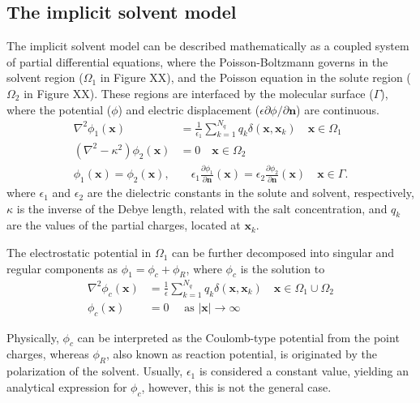 \subsection*{\sffamily \large The implicit solvent model}

The implicit solvent model can be described mathematically as a coupled system of partial differential equations, where the Poisson-Boltzmann governs in the solvent region ($\Omega_1$ in Figure XX), and the Poisson equation in the solute region ($\Omega_2$ in Figure XX). These regions are interfaced by the molecular surface ($\Gamma$), where the potential ($\phi$) and electric displacement ($\epsilon\partial\phi/\partial\mathbf{n}$) are continuous. 
%
\begin{align}\label{eq:pbe}
\nabla^2\phi_1(\mathbf{x}) &= \frac{1}{\epsilon_1}\sum_{k=1}^{N_q} q_k\delta(\mathbf{x},\mathbf{x}_k) \quad  \mathbf{x} \in \Omega_1\nonumber\\
\left(\nabla^2 - \kappa^2\right)\phi_2(\mathbf{x})  &= 0 \quad\mathbf{x}\in\Omega_2\nonumber\\
\phi_1(\mathbf{x})  = \phi_2 (\mathbf{x}), &\quad \epsilon_1\frac{\partial\phi_1}{\partial\mathbf{n}}(\mathbf{x})  = \epsilon_2\frac{\partial\phi_2}{\partial\mathbf{n}}(\mathbf{x})  \quad \mathbf{x}\in \Gamma. 
\end{align}
%
where $\epsilon_1$ and $\epsilon_2$ are the dielectric constants in the solute and solvent, respectively, $\kappa$ is the inverse of the Debye length, related with the salt concentration, and $q_k$ are the values of the partial charges, located at $\mathbf{x}_k$.

The electrostatic potential in $\Omega_1$ can be further decomposed into singular and regular components as $\phi_1 = \phi_c + \phi_R$, where $\phi_c$ is the solution to
%
\begin{align}\label{eq:phic}
\nabla^2\phi_c(\mathbf{x}) &= \frac{1}{\epsilon}\sum_{k=1}^{N_q}q_k\delta(\mathbf{x},\mathbf{x}_k) \quad \mathbf{x}\in\Omega_1\cup\Omega_2\nonumber\\
\phi_c(\mathbf{x})&=0 \quad \text{ as } |\mathbf{x}|\to\infty
\end{align}

Physically, $\phi_c$ can be interpreted as the Coulomb-type potential from the point charges, whereas $\phi_R$, also known as reaction potential, is originated by the polarization of the solvent. 
Usually, $\epsilon_1$ is considered a constant value, yielding an analytical expression for $\phi_c$, however, this is not the general case.

